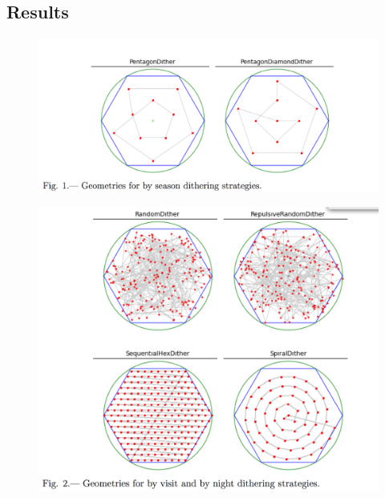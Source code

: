 






\subsection{Results}
\label{sec:\secname:results}




\begin{figure}[tbh!]
\vskip -0.1in
\includegraphics[angle=0,width=0.99\hsize:,clip]{figs/awan_fig1.png}
\caption{}
\label{fig:seasonal_dithers}
\end{figure}

\begin{figure}[tbh!]
\vskip -0.1in
\includegraphics[angle=0,width=0.99\hsize:,clip]{figs/awan_fig2.png}
\caption{}
\label{fig:nightly_dithers}
\end{figure}

